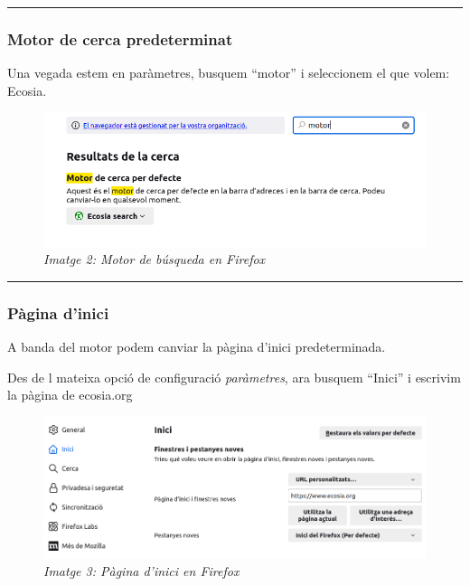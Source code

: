 \documentclass[
  a4paper,
]{article}
\begin{document}
\begin{center}\rule{0.5\linewidth}{0.5pt}\end{center}

\subsubsection{Motor de cerca
predeterminat}\label{motor-de-cerca-predeterminat}

Una vegada estem en paràmetres, busquem ``motor'' i seleccionem el que
volem: Ecosia.

\begin{figure}
\centering
\includegraphics{png/2-Firefox-Motor.png}
\caption{\emph{Imatge 2: Motor de búsqueda en Firefox}}
\end{figure}

\begin{center}\rule{0.5\linewidth}{0.5pt}\end{center}

\subsubsection{Pàgina d'inici}\label{puxe0gina-dinici}

A banda del motor podem canviar la pàgina d'inici predeterminada.

Des de l mateixa opció de configuració \emph{paràmetres}, ara busquem
``Inici'' i escrivim la pàgina de ecosia.org

\begin{figure}
\centering
\includegraphics{png/3-Firefox-Inici.png}
\caption{\emph{Imatge 3: Pàgina d'inici en Firefox}}
\end{figure}
\end{document}
